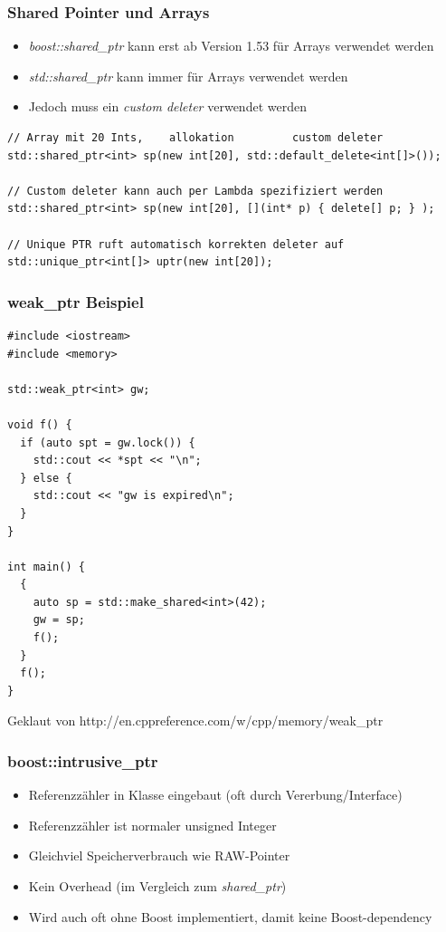 \documentclass{beamer}
\begin{document}
\begin{frame}[fragile]
\frametitle{Shared Pointer und Arrays}
\begin{itemize}
	\item \textit{boost::shared\_ptr} kann erst ab Version 1.53 für Arrays verwendet werden
	\item \textit{std::shared\_ptr} kann immer für Arrays verwendet werden
	\item Jedoch muss ein \textit{custom deleter} verwendet werden
\end{itemize}
\begin{lstlisting}
// Array mit 20 Ints,    allokation         custom deleter
std::shared_ptr<int> sp(new int[20], std::default_delete<int[]>());

// Custom deleter kann auch per Lambda spezifiziert werden
std::shared_ptr<int> sp(new int[20], [](int* p) { delete[] p; } );

// Unique PTR ruft automatisch korrekten deleter auf
std::unique_ptr<int[]> uptr(new int[20]);
\end{lstlisting}
\end{frame}

\begin{frame}[fragile]
 \frametitle{weak\_ptr Beispiel}
 \begin{lstlisting}
#include <iostream>
#include <memory>

std::weak_ptr<int> gw;

void f() {
  if (auto spt = gw.lock()) {
	std::cout << *spt << "\n";
  } else {
    std::cout << "gw is expired\n";
  }
}

int main() {
  {
    auto sp = std::make_shared<int>(42);
  	gw = sp;
  	f();
  }
  f();
}
 \end{lstlisting}
 \tiny Geklaut von http://en.cppreference.com/w/cpp/memory/weak\_ptr
\end{frame}

\begin{frame}[fragile]
 \frametitle{boost::intrusive\_ptr}
 \begin{itemize}
   \item Referenzzähler in Klasse eingebaut \tiny (oft durch Vererbung/Interface)\normalsize
   \item Referenzzähler ist normaler unsigned Integer
   \item Gleichviel Speicherverbrauch wie RAW-Pointer
   \item Kein Overhead (im Vergleich zum \textit{shared\_ptr})
   \item Wird auch oft ohne Boost implementiert, damit keine Boost-dependency
 \end{itemize}
\end{frame}
\end{document}
